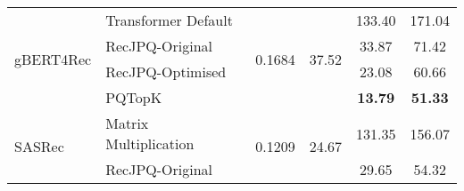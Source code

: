 \begin{tabular}{llcccc}
\multicolumn{1}{l|}{\multirow{4}{*}{gBERT4Rec}}                               & \multicolumn{1}{l|}{Transformer Default}                                               & \multirow{4}{*}{0.1684}                            & \multirow{4}{*}{37.52}                                      & 133.40                                                  & 171.04                                                \\
\multicolumn{1}{l|}{}                                                         & \multicolumn{1}{l|}{RecJPQ-Original}                                                     &                                                    &                                                             & 33.87                                                   & 71.42                                                 \\
\multicolumn{1}{l|}{}                                                         & \multicolumn{1}{l|}{RecJPQ-Optimised}                                                    &                                                    &                                                             & 23.08                                                   & 60.66                                                 \\
\multicolumn{1}{l|}{}                                                         & \multicolumn{1}{l|}{PQTopK}                                                             &                                                    &                                                             & \textbf{13.79}                                          & \textbf{51.33}                                        \\ \hline
\multicolumn{1}{l|}{\multirow{4}{*}{SASRec}}                                  & \multicolumn{1}{l|}{Matrix Multiplication}                                               & \multirow{4}{*}{0.1209}                            & \multirow{4}{*}{24.67}                                      & 131.35                                                  & 156.07                                                \\
\multicolumn{1}{l|}{}                                                         & \multicolumn{1}{l|}{RecJPQ-Original}                                                     &                                                    &                                                             & 29.65                                                   & 54.32                                                 \\

\end{tabular}
